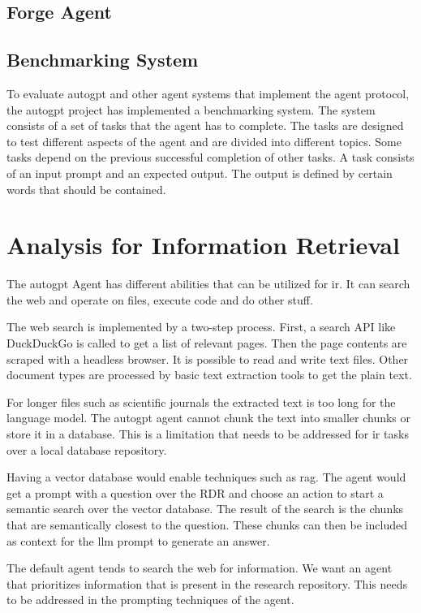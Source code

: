 \documentclass[../main.tex]{subfiles}
\begin{document}
\subsection{Forge Agent}
\label{subsec:forge_agent}

\subsection{Benchmarking System}
\label{subsec:benchmarking}

To evaluate \gls{autogpt} and other agent systems that implement the agent protocol,
the \gls{autogpt} project has implemented a benchmarking system.
The system consists of a set of tasks that the agent has to complete.
The tasks are designed to test different aspects of the agent and are divided into different topics.
Some tasks depend on the previous successful completion of other tasks.
A task consists of an input prompt and an expected output.
The output is defined by certain words that should be contained.


\section{Analysis for Information Retrieval}

The \gls{autogpt} Agent has different abilities that can be utilized for \gls{ir}.
It can search the web and operate on files, execute code and do other stuff. %

The web search is implemented by a two-step process.
First, a search API like DuckDuckGo is called to get a list of relevant pages.
Then the page contents are scraped with a headless browser.
It is possible to read and write text files.
Other document types are processed by basic text extraction tools to get the plain text.

For longer files such as scientific journals the extracted text is too long for the language model.
The \gls{autogpt} agent cannot chunk the text into smaller chunks or store it in a database.
This is a limitation that needs to be addressed for \gls{ir} tasks over a local database repository.

Having a vector database would enable techniques such as \gls{rag}.
The agent would get a prompt with a question over the RDR and choose an action to start a semantic search over the vector database.
The result of the search is the chunks that are semantically closest to the question.
These chunks can then be included as context for the \gls{llm} prompt to generate an answer.

The default agent tends to search the web for information. We want an agent that prioritizes information that is present in the research repository.
This needs to be addressed in the prompting techniques of the agent.
\end{document}
